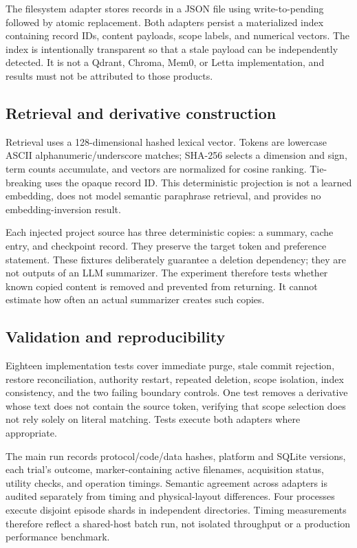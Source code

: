 ﻿\documentclass[sigconf,nonacm]{acmart}
\begin{document}
The filesystem adapter stores records in a JSON file using write-to-pending followed by atomic replacement. Both adapters persist a materialized index containing record IDs, content payloads, scope labels, and numerical vectors. The index is intentionally transparent so that a stale payload can be independently detected. It is not a Qdrant, Chroma, Mem0, or Letta implementation, and results must not be attributed to those products.

\subsection{Retrieval and derivative construction}
Retrieval uses a 128-dimensional hashed lexical vector. Tokens are lowercase ASCII alphanumeric/underscore matches; SHA-256 selects a dimension and sign, term counts accumulate, and vectors are normalized for cosine ranking. Tie-breaking uses the opaque record ID. This deterministic projection is not a learned embedding, does not model semantic paraphrase retrieval, and provides no embedding-inversion result.

Each injected project source has three deterministic copies: a summary, cache entry, and checkpoint record. They preserve the target token and preference statement. These fixtures deliberately guarantee a deletion dependency; they are not outputs of an LLM summarizer. The experiment therefore tests whether known copied content is removed and prevented from returning. It cannot estimate how often an actual summarizer creates such copies.

\subsection{Validation and reproducibility}
Eighteen implementation tests cover immediate purge, stale commit rejection, restore reconciliation, authority restart, repeated deletion, scope isolation, index consistency, and the two failing boundary controls. One test removes a derivative whose text does not contain the source token, verifying that scope selection does not rely solely on literal matching. Tests execute both adapters where appropriate.

The main run records protocol/code/data hashes, platform and SQLite versions, each trial's outcome, marker-containing active filenames, acquisition status, utility checks, and operation timings. Semantic agreement across adapters is audited separately from timing and physical-layout differences. Four processes execute disjoint episode shards in independent directories. Timing measurements therefore reflect a shared-host batch run, not isolated throughput or a production performance benchmark.
\end{document}
